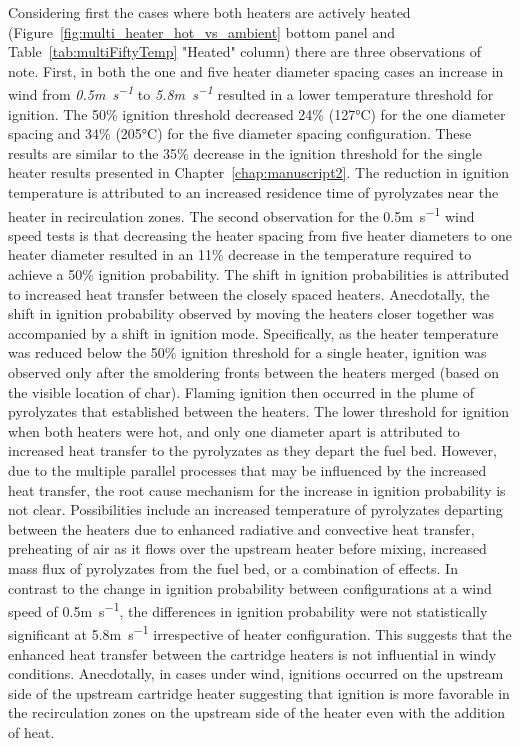     Considering first the cases where both heaters are actively heated (Figure~\ref{fig:multi_heater_hot_vs_ambient} bottom panel and Table~\ref{tab:multiFiftyTemp} "Heated" column) there are three observations of note. First, in both the one and five heater diameter spacing cases an increase in wind from \textit{0.5\si{\meter\per\second}} to \textit{5.8\si{\meter\per\second}} resulted in a lower temperature threshold for ignition. The 50\% ignition threshold decreased 24\% (127\si{\celsius}) for the one diameter spacing and 34\% (205\si{\celsius}) for the five diameter spacing configuration. These results are similar to the 35\% decrease in the ignition threshold for the single heater results presented in Chapter~\ref{chap:manuscript2}. The reduction in ignition temperature is attributed to an increased residence time of pyrolyzates near the heater in recirculation zones. The second observation for the 0.5\si{\meter\per\second} wind speed tests is that decreasing the heater spacing from five heater diameters to one heater diameter resulted in an 11\% decrease in the temperature required to achieve a 50\% ignition probability. The shift in ignition probabilities is attributed to increased heat transfer between the closely spaced heaters. Anecdotally, the shift in ignition probability observed by moving the heaters closer together was accompanied by a shift in ignition mode. Specifically, as the heater temperature was reduced below the 50\% ignition threshold for a single heater, ignition was observed only after the smoldering fronts between the heaters merged (based on the visible location of char). Flaming ignition then occurred in the plume of pyrolyzates that established between the heaters. The lower threshold for ignition when both heaters were hot, and only one diameter apart is attributed to increased heat transfer to the pyrolyzates as they depart the fuel bed. However, due to the multiple parallel processes that may be influenced by the increased heat transfer, the root cause mechanism for the increase in ignition probability is not clear. Possibilities include an increased temperature of pyrolyzates departing between the heaters due to enhanced radiative and convective heat transfer, preheating of air as it flows over the upstream heater before mixing, increased mass flux of pyrolyzates from the fuel bed, or a combination of effects. In contrast to the change in ignition probability between configurations at a wind speed of 0.5\si{\meter\per\second}, the differences in ignition probability were not statistically significant at 5.8\si{\meter\per\second} irrespective of heater configuration. This suggests that the enhanced heat transfer between the cartridge heaters is not influential in windy conditions. Anecdotally, in cases under wind, ignitions occurred on the upstream side of the upstream cartridge heater suggesting that ignition is more favorable in the recirculation zones on the upstream side of the heater even with the addition of heat.
   
